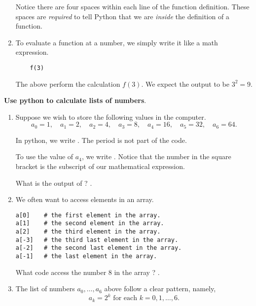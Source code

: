 \documentclass[../main.tex]{subfiles}
\begin{document}
\begin{enumerate}
    \faExclamationTriangle{} Notice there are four spaces within each line of the function definition. These spaces are \emph{required} to tell Python that we are \emph{inside} the definition of a function. 

  \item To evaluate a function at a number, we simply write it like a math expression.
    \begin{verbatim}
    f(3)
    \end{verbatim}
    The above perform the calculation \(f(3)\). We expect the output to be \(3^{2} = 9\).

\end{enumerate}

\textbf{Use python to calculate lists of numbers}.
\begin{enumerate}
  \item Suppose we wish to store the following values in the computer. 
    \[
      a_{0} = 1, \quad a_{1} = 2, \quad a_{2} = 4, \quad  a_{3} = 8, \quad a_{4} = 16, \quad a_{5} = 32, \quad a_{6} = 64.
    \]

    In python, we write .  The period is not part of the code.

    To use the value of \(a_{4}\), we write .  Notice that the number in the square bracket is the subscript of our mathematical expression.

    \faComment{} What is the output of ? \underline{\hspace{2in}}.

  \item We often want to access elements in an array.  
    \begin{verbatim}
a[0]    # the first element in the array.
a[1]    # the second element in the array.
a[2]    # the third element in the array.
a[-3]   # the third last element in the array. 
a[-2]   # the second last element in the array. 
a[-1]   # the last element in the array.
    \end{verbatim}
    
    \faComment{} What code access the number \(8\) in the array ? \underline{\hspace{1in}}.

  \item The list of numbers \(a_{0}, \ldots, a_{6}\) above follow a clear pattern, namely, 
    \[
      a_{k} = 2^{k} \text{ for each } k = 0, 1, \ldots, 6.
    \]
    

\end{enumerate}
\end{document}
